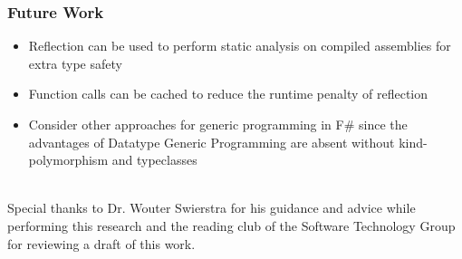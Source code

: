 \documentclass{beamer}
\begin{document}
\begin{frame}
  \frametitle{Future Work}
  \begin{itemize}

    \item Reflection can be used to perform static analysis on
      compiled assemblies for extra type safety
    \item Function calls can be cached to reduce the runtime penalty
      of reflection
    \item Consider other approaches for generic programming in F\#
      since the advantages of Datatype Generic Programming are absent
      without kind-polymorphism and typeclasses
  \end{itemize}
  
\end{frame}

\begin{frame}

  \vspace{2cm}
  \\Special thanks to Dr. Wouter Swierstra for his guidance and advice
  while performing this research and the reading club of the Software
  Technology Group for reviewing a draft of this work.

\end{frame}
\end{document}
